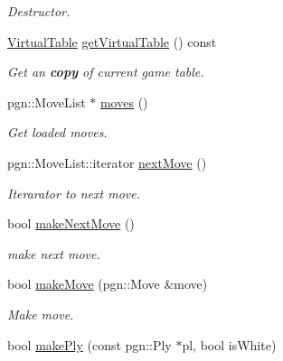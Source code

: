 \begin{DoxyCompactItemize}
\begin{DoxyCompactList}\small\item\em Destructor. \item\end{DoxyCompactList}\item 
\hyperlink{classChEngn_1_1Table}{VirtualTable} \hyperlink{classChEngn_1_1Engine_a26f8db48e99d547fbc41eaa9dca8e6cf}{getVirtualTable} () const 
\begin{DoxyCompactList}\small\item\em Get an {\bfseries copy} of current game table. \item\end{DoxyCompactList}\item 
pgn::MoveList $\ast$ \hyperlink{classChEngn_1_1Engine_aad1f51b4eed22bb6eab999ffb7fa2516}{moves} ()
\begin{DoxyCompactList}\small\item\em Get loaded moves. \item\end{DoxyCompactList}\item 
pgn::MoveList::iterator \hyperlink{classChEngn_1_1Engine_ad35252a7c6a7e84a34d12a688360a75f}{nextMove} ()
\begin{DoxyCompactList}\small\item\em Iterarator to next move. \item\end{DoxyCompactList}\item 
bool \hyperlink{classChEngn_1_1Engine_a16b3f2bb7787bccf321f8a03935947c2}{makeNextMove} ()
\begin{DoxyCompactList}\small\item\em make next move. \item\end{DoxyCompactList}\item 
bool \hyperlink{classChEngn_1_1Engine_a3bfc7cfe7e147e4d5d7f645d0cb72c8d}{makeMove} (pgn::Move \&move)
\begin{DoxyCompactList}\small\item\em Make move. \item\end{DoxyCompactList}\item 
bool \hyperlink{classChEngn_1_1Engine_a66f202e6cd42b2eeff43c8d58fe9ce38}{makePly} (const pgn::Ply $\ast$pl, bool isWhite)
\end{DoxyCompactItemize}
